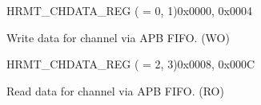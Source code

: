 \begin{register}{H}{RMT\_CHDATA\_REG ( = 0, 1)}{0x0000, 0x0004}\label{regdesc:RMTCHNDATAREG}
%
\regnewline%
\begin{regdesc}\begin{reglist}
\label{fielddesc:RMTCHNDATA}\item [RMT\_CH\regindex{n}DATA] Write data for channel  via APB FIFO. (WO)
\end{reglist}\end{regdesc}
\end{register}

\begin{register}{H}{RMT\_CHDATA\_REG ( = 2, 3)}{0x0008, 0x000C}\label{regdesc:RMTCHMDATAREG}
%
\regnewline%
\begin{regdesc}\begin{reglist}
\label{fielddesc:RMTCHMDATA}\item [RMT\_CH\regindex{m}DATA] Read data for channel  via APB FIFO. (RO)
\end{reglist}\end{regdesc}
\end{register}


